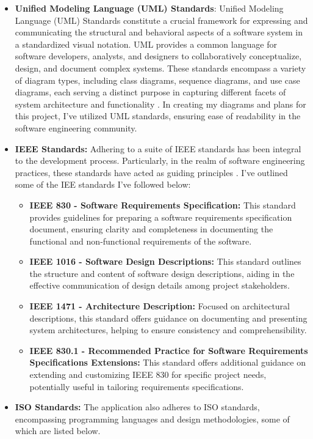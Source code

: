 \begin{itemize}
    \item \textbf{Unified Modeling Language (UML) Standards}: Unified Modeling Language (UML) Standards constitute a crucial framework for expressing and communicating the structural and behavioral aspects of a software system in a standardized visual notation. UML provides a common language for software developers, analysts, and designers to collaboratively conceptualize, design, and document complex systems. These standards encompass a variety of diagram types, including class diagrams, sequence diagrams, and use case diagrams, each serving a distinct purpose in capturing different facets of system architecture and functionality \cite{UML}. In creating my diagrams and plans for this project, I've utilized UML standards, ensuring ease of readability in the software engineering community.
    \item \textbf{IEEE Standards:} Adhering to a suite of IEEE standards has been integral to the development process. Particularly, in the realm of software engineering practices, these standards have acted as guiding principles \cite{IEEEStd}. I've outlined some of the IEE standards I've followed below:
        \begin{itemize}
        \item \textbf{IEEE 830 - Software Requirements Specification:}
        This standard provides guidelines for preparing a software requirements specification document, ensuring clarity and completeness in documenting the functional and non-functional requirements of the software.
        \item \textbf{IEEE 1016 - Software Design Descriptions:}
        This standard outlines the structure and content of software design descriptions, aiding in the effective communication of design details among project stakeholders.
        \item \textbf{IEEE 1471 - Architecture Description:}
        Focused on architectural descriptions, this standard offers guidance on documenting and presenting system architectures, helping to ensure consistency and comprehensibility.
        \item \textbf{IEEE 830.1 - Recommended Practice for Software Requirements Specifications Extensions:}
        This standard offers additional guidance on extending and customizing IEEE 830 for specific project needs, potentially useful in tailoring requirements specifications.
        \end{itemize}
    \item \textbf{ISO Standards:} The application also adheres to ISO standards, encompassing programming languages and design methodologies, some of which are listed below.

\end{itemize}
